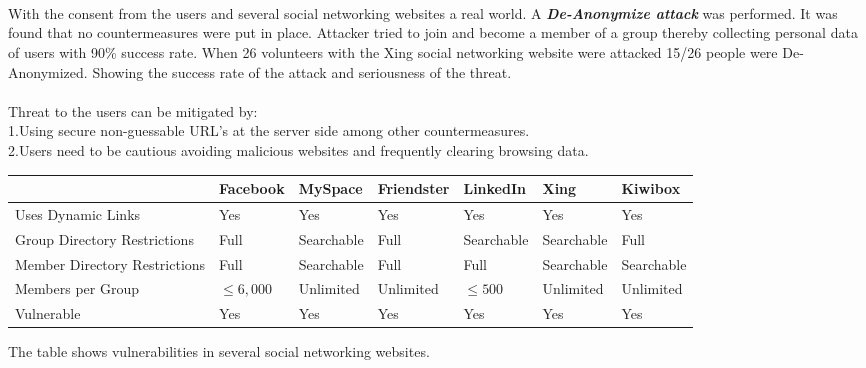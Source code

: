 \documentclass{article}
\begin{document}
\\
\\
\\
With the consent from the users and several social networking websites a real world. A \textbf{\textit{De-Anonymize attack}} was performed. It was found that no countermeasures were put in place. Attacker tried to join and become a member of a group thereby collecting personal data of users with 90\% success rate. When 26 volunteers with the Xing social networking website were attacked 15/26 people were De-Anonymized. Showing the success rate of the attack and seriousness of the threat.
\\
\\
Threat to the users can be mitigated by:
\\
1.Using secure non-guessable URL’s at the server side among other countermeasures.\\
2.Users need to be cautious avoiding malicious websites and frequently clearing browsing data.\\

\begin{center}
\begin{tabular}{|p{1.5cm}||p{1.5cm}|p{1.7cm}|p{1.5cm}|p{1.7cm}|p{1.7cm}|p{1.7cm}| }
\hline
& Facebook & MySpace & Friendster & LinkedIn & Xing & Kiwibox\\
\hline
Uses Dynamic Links&Yes&Yes&Yes&Yes&Yes&Yes\\
\hline
Group Directory Restrictions&Full&Searchable&Full&Searchable& Searchable&Full\\ 
\hline
Member Directory Restrictions&Full&Searchable&Full&Full&Searchable&Searchable\\
\hline
Members per Group & $\leq6,000$ & Unlimited & Unlimited & $\leq500$ & Unlimited & Unlimited\\
\hline
Vulnerable&Yes&Yes&Yes&Yes&Yes&Yes\\
\hline
\end{tabular}
\end{center}
The table shows vulnerabilities in several social networking websites.
\\
\end{document}
